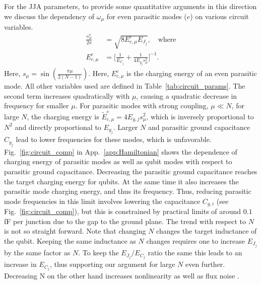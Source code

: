 \documentclass[%
reprint,
superscriptaddress,
 amsmath,amssymb,
 aps,
 prx,
longbibliography,
floatfix,
]{revtex4-2}
\newcommand{\sh}[1]{{\color{orange}{{}[SS: #1]}}}%
\begin{document}
For the JJA parameters, to provide some quantitative arguments in this direction we discuss the dependency of $\omega_\mu$ for even parasitic modes ($e$) on various circuit variables. 
\begin{align}
    \frac{\omega_\mu^e}{2\pi}&=\sqrt{8E_{c,\mu}^e E_{J_j}},\quad\text{where}\\
    E_{c,\mu}^e&=\Big[\frac{1}{E_{C_j}}+\frac{1}{4E_{g_j}s_\mu^2}\Big]^{-1}.
\end{align}
Here, $s_\mu = \sin (\frac{\pi \mu}{2(N-1)})$. Here, $E_{c,\mu}^e$ is the charging energy of an even parasitic mode. All other variables used are defined in Table~\ref{tab:circuit_params}. The second term increases quadratically with $\mu$, causing a quadratic decrease in frequency for smaller $\mu$. For parasitic modes with strong coupling, $\mu\ll N$, for large $N$, the charging energy is $\tilde{E}^e_{c,\mu} = 4E_{g,j} s_\mu^2$, which is inversely proportional to $N^2$ and directly proportional to $E_{g_j}$. Larger $N$ and parasitic ground capacitance $C_{g_j}$ lead to lower frequencies for these modes, which is unfavorable. Fig.~\ref{fig:circuit_comp} in App.~\ref{app:Hamiltonian} shows the dependence of charging energy of parasitic modes as well as qubit modes with respect to parasitic ground capacitance. Decreasing the parasitic ground capacitance reaches the target charging energy for qubits. At the same time it also increases the parasitic mode charging energy, and thus its frequency. Thus, reducing parasitic mode frequencies in this limit involves lowering the capacitance  $C_{g,i}$ (see Fig.~\ref{fig:circuit_comp}), but this is constrained by practical limits of around $0.1$ fF per junction due to the gap to the ground plane. The trend with respect to $N$ is not so straight forward. Note that changing $N$ changes the target inductance of the qubit. Keeping the same inductance as $N$ changes requires one to increase $E_{J_j}$ by the same factor as $N$. To keep the $E_{J_j}/E_{C_j}$ ratio the same this leads to an increase in $E_{C_j}$, thus supporting our argument for large $N$ even further. Decreasing N on the other hand increases nonlinearity as well as flux noise \sh{CITE}.
\end{document}
